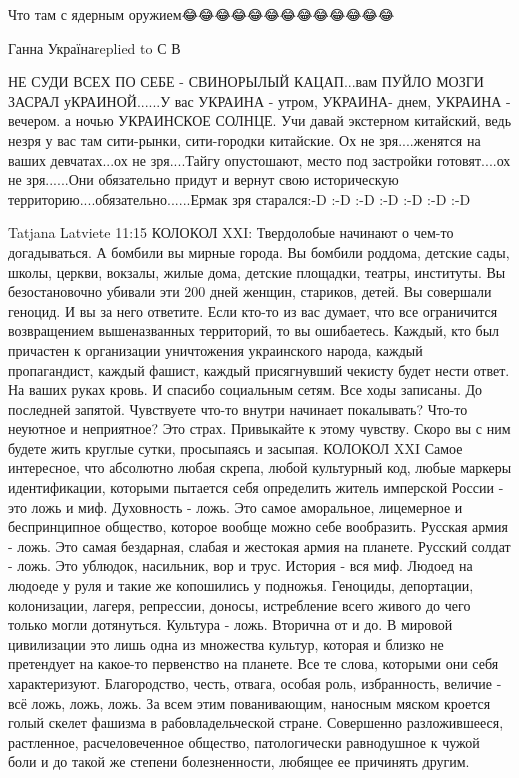 Что там с ядерным оружием😂😂😂😂😂😂😂😂😂😂😂😂😂

Ганна Українаreplied to С В

НЕ СУДИ ВСЕХ ПО СЕБЕ - СВИНОРЫЛЫЙ КАЦАП...вам ПУЙЛО МОЗГИ ЗАСРАЛ
уКРАИНОЙ......У вас УКРАИНА - утром, УКРАИНА- днем, УКРАИНА - вечером. а ночью
УКРАИНСКОЕ СОЛНЦЕ. Учи давай экстерном китайский, ведь незря у вас там
сити-рынки, сити-городки китайские. Ох не зря....женятся на ваших девчатах...ох
не зря....Тайгу опустошают, место под застройки готовят....ох не зря......Они
обязательно придут и вернут свою историческую
территорию....обязательно......Ермак зря старался:-D :-D :-D :-D :-D :-D :-D


Tatjana Latviete
11:15
КОЛОКОЛ XXI:
Твердолобые начинают о чем-то догадываться.
А бомбили вы мирные города. Вы бомбили роддома, детские сады, школы, церкви, вокзалы, жилые дома, детские площадки, театры, институты. Вы безостановочно убивали эти 200 дней женщин, стариков, детей.
Вы совершали геноцид.
И вы за него ответите. Если кто-то из вас думает, что все ограничится возвращением вышеназванных территорий, то вы ошибаетесь.
Каждый, кто был причастен к организации уничтожения украинского народа, каждый пропагандист, каждый фашист, каждый присягнувший чекисту будет нести ответ. На ваших руках кровь. И спасибо социальным сетям. Все ходы записаны. До последней запятой.
Чувствуете что-то внутри начинает покалывать? Что-то неуютное и неприятное? Это страх. Привыкайте к этому чувству. Скоро вы с ним будете жить круглые сутки, просыпаясь и засыпая.
КОЛОКОЛ XXI
Самое интересное, что абсолютно любая скрепа, любой культурный код, любые маркеры идентификации, которыми пытается себя определить житель имперской России - это ложь и миф.
Духовность - ложь. Это самое аморальное, лицемерное и беспринципное общество, которое вообще можно себе вообразить.
Русская армия - ложь. Это самая бездарная, слабая и жестокая армия на планете.
Русский солдат - ложь. Это ублюдок, насильник, вор и трус.
История - вся миф. Людоед на людоеде у руля и такие же копошились у подножья. Геноциды, депортации, колонизации, лагеря, репрессии, доносы, истребление всего живого до чего только могли дотянуться.
Культура - ложь. Вторична от и до. В мировой цивилизации это лишь одна из множества культур, которая и близко не претендует на какое-то первенство на планете.
Все те слова, которыми они себя характеризуют. Благородство, честь, отвага, особая роль, избранность, величие - всё ложь, ложь, ложь.
За всем этим пованивающим, наносным мяском кроется голый скелет фашизма в рабовладельческой стране.
Совершенно разложившееся, растленное, расчеловеченное общество, патологически равнодушное к чужой боли и до такой же степени болезненности, любящее ее причинять другим.

